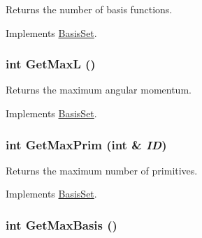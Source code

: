 Returns the number of basis functions. 

Implements \hyperlink{classJKBuilder_1_1BasisSet_a1167cdb6f1e1ba08ba6cbffa0b32ca77}{BasisSet}.\hypertarget{classJKBuilder_1_1AtomicBasisSet_af6694a93cc5d86a8f3cd1aa984a0cdc3}{
\subsubsection[{GetMaxL}]{\setlength{\rightskip}{0pt plus 5cm}int GetMaxL ()}}
\label{classJKBuilder_1_1AtomicBasisSet_af6694a93cc5d86a8f3cd1aa984a0cdc3}


Returns the maximum angular momentum. 

Implements \hyperlink{classJKBuilder_1_1BasisSet_a5580c8eff6cb4242a298c15da2292fa4}{BasisSet}.\hypertarget{classJKBuilder_1_1AtomicBasisSet_a03191bf41d6e3a2445dd3eb8640305be}{
\subsubsection[{GetMaxPrim}]{\setlength{\rightskip}{0pt plus 5cm}int GetMaxPrim (int \& {\em ID})}}
\label{classJKBuilder_1_1AtomicBasisSet_a03191bf41d6e3a2445dd3eb8640305be}


Returns the maximum number of primitives. 

Implements \hyperlink{classJKBuilder_1_1BasisSet_a4e5f8295f4fe1ecf1a910ae2fcb46c1f}{BasisSet}.\hypertarget{classJKBuilder_1_1AtomicBasisSet_adcda37af511d6b4f8d305fcba2da5c4a}{
\subsubsection[{GetMaxBasis}]{\setlength{\rightskip}{0pt plus 5cm}int GetMaxBasis ()}}
\label{classJKBuilder_1_1AtomicBasisSet_adcda37af511d6b4f8d305fcba2da5c4a}


